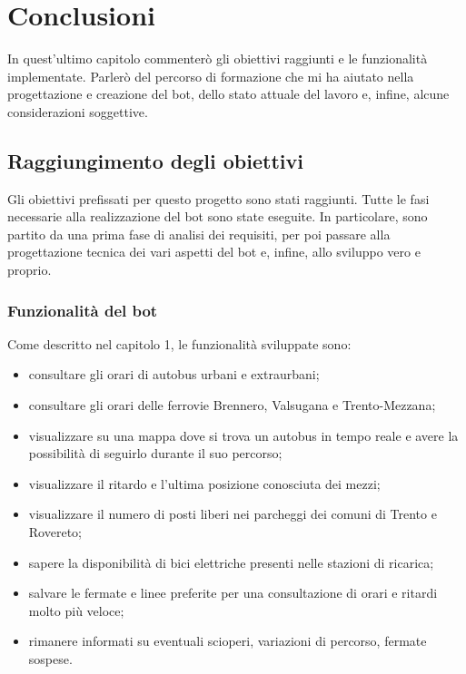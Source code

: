 \chapter{Conclusioni}
\label{cha:conclusioni}

In quest'ultimo capitolo commenterò gli obiettivi raggiunti e le funzionalità implementate. Parlerò del percorso di formazione che mi ha aiutato nella progettazione e creazione del bot, dello stato attuale del lavoro e, infine, alcune considerazioni soggettive. 

\section{Raggiungimento degli obiettivi}

Gli obiettivi prefissati per questo progetto sono stati raggiunti. Tutte le fasi necessarie alla realizzazione del bot sono state eseguite. In particolare, sono partito da una prima fase di analisi dei requisiti, per poi passare alla progettazione tecnica dei vari aspetti del bot e, infine, allo sviluppo vero e proprio. 

\subsection{Funzionalità del bot}

Come descritto nel capitolo 1, le funzionalità sviluppate sono: 
\begin{itemize}
\item consultare gli orari di autobus urbani e extraurbani;
\item consultare gli orari delle ferrovie Brennero, Valsugana e Trento-Mezzana;
\item visualizzare su una mappa dove si trova un autobus in tempo reale e avere la possibilità di seguirlo durante il suo percorso;
\item visualizzare il ritardo e l'ultima posizione conosciuta dei mezzi;
\item visualizzare il numero di posti liberi nei parcheggi dei comuni di Trento e Rovereto;
\item sapere la disponibilità di bici elettriche presenti nelle stazioni di ricarica;
\item salvare le fermate e linee preferite per una consultazione di orari e ritardi molto più veloce;
\item rimanere informati su eventuali scioperi, variazioni di percorso, fermate sospese.
\end{itemize}

